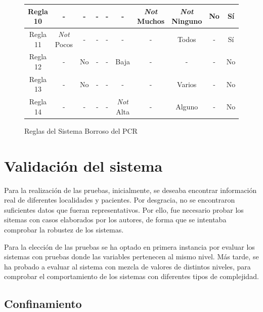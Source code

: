\documentclass[12pt,a4paper, xcolor=table]{article}
\begin{document}
\begin{figure}[!h]
\begin{adjustwidth}{-1.3cm}{}
\begin{tabular}{c|c|c|c|c|c|c|c|c|c|}
\multicolumn{1}{|c|}{Regla 10} & - & - & - & - & - & \textit{Not} Muchos & \textit{Not} Ninguno & No & Sí \\ \hline
\multicolumn{1}{|c|}{Regla 11} & \textit{Not} Pocos & - & - & - & - & - & Todos & - & Sí \\ \hline
\multicolumn{1}{|c|}{Regla 12} & - & No & - & - & Baja & - & - & - & No \\ \hline
\multicolumn{1}{|c|}{Regla 13} & - & No & - & - & - & - & Varios & - & No \\ \hline
\multicolumn{1}{|c|}{Regla 14} & - & - & - & - & \textit{Not} Alta & - & Alguno & - & No \\ \hline
\end{tabular}
\end{adjustwidth}
\caption{Reglas del Sistema Borroso del PCR}
\end{figure}





\section{Validación del sistema}

Para la realización de las pruebas, inicialmente, se deseaba encontrar información real de diferentes localidades\cite{cant, cana} y pacientes. Por desgracia, no se encontraron suficientes datos que fueran representativos. Por ello, fue necesario probar los sitemas con casos elaborados por los autores, de forma que se intentaba comprobar la robustez de los sistemas.

\vspace{3mm}

Para la elección de las pruebas se ha optado en primera instancia por evaluar los sistemas con pruebas donde las variables pertenecen al mismo nivel. Más tarde, se ha probado a evaluar al sistema con mezcla de valores de distintos niveles, para comprobar el comportamiento de los sistemas con diferentes tipos de complejidad.
  \subsection{Confinamiento}
\end{document}
